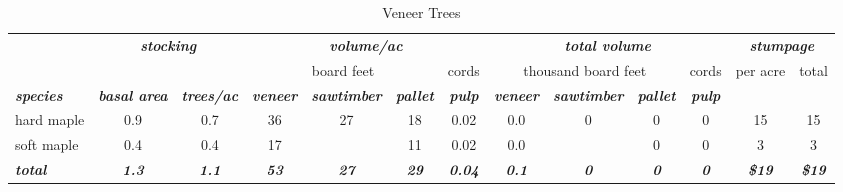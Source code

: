\documentclass[landscape]{article}
\begin{document}
\begin{table}[H]

\caption{\label{tab:unnamed-chunk-39}Veneer Trees}
\fontsize{10}{12}\selectfont
\begin{tabular}[t]{lcccccccccccc}
\toprule
\multicolumn{1}{c}{\em{\textbf{ }}} & \multicolumn{2}{c}{\em{\textbf{stocking}}} & \multicolumn{4}{c}{\em{\textbf{volume/ac }}} & \multicolumn{4}{c}{\em{\textbf{total volume}}} & \multicolumn{2}{c}{\em{\textbf{stumpage}}} \\
\cmidrule(l{3pt}r{3pt}){2-3} \cmidrule(l{3pt}r{3pt}){4-7} \cmidrule(l{3pt}r{3pt}){8-11} \cmidrule(l{3pt}r{3pt}){12-13}
\multicolumn{3}{c}{ } & \multicolumn{3}{c}{board feet} & \multicolumn{1}{c}{cords} & \multicolumn{3}{c}{thousand board feet} & \multicolumn{1}{c}{cords} & \multicolumn{1}{c}{per acre} & \multicolumn{1}{c}{total} \\
\cmidrule(l{3pt}r{3pt}){4-6} \cmidrule(l{3pt}r{3pt}){7-7} \cmidrule(l{3pt}r{3pt}){8-10} \cmidrule(l{3pt}r{3pt}){11-11} \cmidrule(l{3pt}r{3pt}){12-12} \cmidrule(l{3pt}r{3pt}){13-13}
\rowcolor[HTML]{DCDCDC}  \em{\textbf{species}} & \em{\textbf{basal area}} & \em{\textbf{trees/ac}} & \em{\textbf{veneer}} & \em{\textbf{sawtimber}} & \em{\textbf{pallet}} & \em{\textbf{pulp}} & \em{\textbf{veneer}} & \em{\textbf{sawtimber}} & \em{\textbf{pallet}} & \em{\textbf{pulp}} & \em{\textbf{ }} & \em{\textbf{ }}\\
\midrule
\rowcolor{gray!6}  hard maple & 0.9 & 0.7 & 36 & 27 & 18 & 0.02 & 0.0 & 0 & 0 & 0 & 15 & 15\\
 
soft maple & 0.4 & 0.4 & 17 &  & 11 & 0.02 & 0.0 &  & 0 & 0 & 3 & 3\\
 
\rowcolor{gray!6}  \rowcolor[HTML]{DCDCDC}  \em{\textbf{total}} & \em{\textbf{1.3}} & \em{\textbf{1.1}} & \em{\textbf{53}} & \em{\textbf{27}} & \em{\textbf{29}} & \em{\textbf{0.04}} & \em{\textbf{0.1}} & \em{\textbf{0}} & \em{\textbf{0}} & \em{\textbf{0}} & \em{\textbf{\$19}} & \em{\textbf{\$19}}\\
\bottomrule
\end{tabular}
\end{table}
\end{document}
